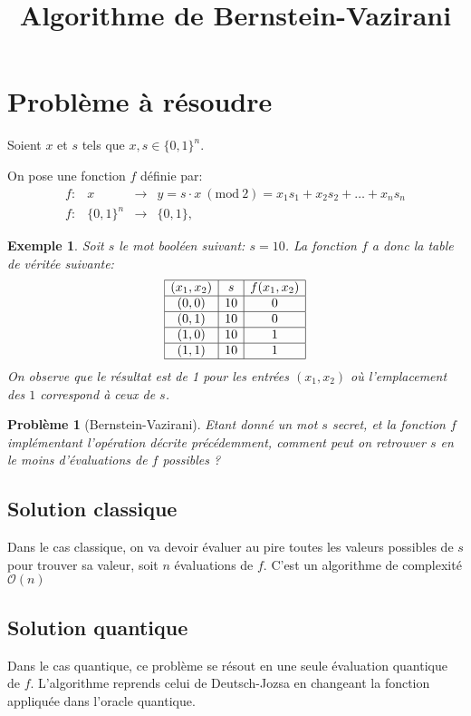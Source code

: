 \documentclass[12pt,a4paper]{article}
\title{Algorithme de Bernstein-Vazirani}
\date{}
\newcommand{\Mod}[1]{\ (\mathrm{mod}\ #1)}
\newtheorem{pb}{Problème}
\newtheorem{ex}{Exemple}
\begin{document}
\maketitle

\section{Problème à résoudre}

Soient $x$ et $s$ tels que $x, s \in \{0, 1\}^n$.

On pose une fonction $f$ définie par:
\[
  \begin{array}{llll}
    f :  &  x              & \to     & y = s \cdot x \Mod{2} = x_1 s_1 + x_2 s_2 + \dots + x_n s_n \\
    f:   &  \{0, 1\}^n     & \to     & \{0, 1\},
  \end{array}  
\]

\begin{ex}
  Soit $s$ le mot booléen suivant: $s = 10$. La fonction $f$ a donc la table de véritée suivante:
\[
  \begin{array}{|c|c|c|}
    \hline
   (x_1, x_2) & s & f(x_1,x_2) \\
    \hline
    (0,0) & 10 & 0 \\
    \hline
    (0,1) & 10 & 0 \\
    \hline
    (1,0) & 10 & 1 \\
    \hline
    (1,1) & 10 & 1 \\
    \hline
  \end{array}
\]
On observe que le résultat est de 1 pour les entrées $(x_1, x_2)$ où l'emplacement des $1$ correspond à ceux de $s$.
\end{ex}

\begin{pb}[Bernstein-Vazirani]
Etant donné un mot $s$ secret, et la fonction $f$ implémentant l'opération décrite précédemment, comment peut on retrouver $s$ en le moins d'évaluations de $f$ possibles ?
\end{pb}

\subsection{Solution classique}
Dans le cas classique, on va devoir évaluer au pire toutes les valeurs possibles de $s$ pour trouver sa valeur, soit $n$ évaluations de $f$. C'est un algorithme de complexité $\mathcal{O}(n)$

\subsection{Solution quantique}
Dans le cas quantique, ce problème se résout en une seule évaluation
quantique de $f$. L'algorithme reprends celui de Deutsch-Jozsa en changeant la fonction appliquée dans l'oracle quantique.
\end{document}

